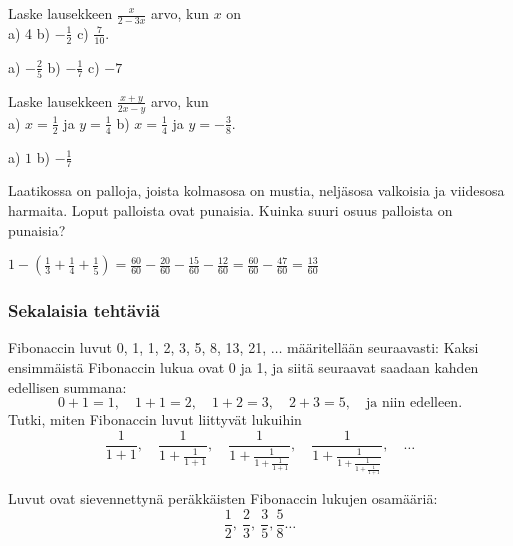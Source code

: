 \begin{tehtava}
Laske lausekkeen $\frac{x}{2-3x}$ arvo, kun $x$ on \\ a) 4 \qquad b) $-\frac{1}{2}$ \qquad c) $\frac{7}{10}$.
\begin{vastaus}
a) $-\frac{2}{5}$ \qquad b) $-\frac{1}{7}$ \qquad c) $-7$
\end{vastaus}
\end{tehtava}

\begin{tehtava}
Laske lausekkeen $\frac{x+y}{2x-y}$ arvo, kun \\ a) $x=\frac{1}{2}$ ja $y= \frac{1}{4}$ \qquad b) $x=\frac{1}{4}$ ja $y= -\frac{3}{8}$.
\begin{vastaus}
a) $1$ \qquad b) $-\frac{1}{7}$
\end{vastaus}
\end{tehtava}

    \begin{tehtava} %
        Laatikossa on palloja, joista kolmasosa on mustia, neljäsosa
        valkoisia ja viidesosa harmaita. Loput palloista ovat punaisia.
        Kuinka suuri osuus palloista on punaisia?
        
        \begin{vastaus}
            $1-(\frac{1}{3}+\frac{1}{4}+\frac{1}{5})
            = \frac{60}{60}-\frac{20}{60}-\frac{15}{60}-\frac{12}{60}
            = \frac{60}{60}-\frac{47}{60}
            = \frac{13}{60}$
        \end{vastaus}
    \end{tehtava}


\subsubsection*{Sekalaisia tehtäviä}

\begin{tehtava}
Fibonaccin luvut 0, 1, 1, 2, 3, 5, 8, 13, 21, $\ldots$ määritellään seuraavasti: Kaksi ensimmäistä
Fibonaccin lukua ovat 0 ja 1, ja siitä seuraavat saadaan kahden
edellisen summana: 
\[ 0+1=1, \quad 1+1=2, \quad 1+2 = 3, \quad 2+3=5, \quad 
\textrm{ja niin edelleen.} \]
Tutki, miten Fibonaccin luvut liittyvät lukuihin
\[ \frac{1}{1+1}, \quad \frac{1}{1+\frac{1}{1+1}}, \quad
\frac{1}{1+\frac{1}{1+\frac{1}{1+1}}}, \quad 
\frac{1}{1+\frac{1}{1+\frac{1}{1+\frac{1}{1+1}}}}, \quad \ldots\]
\begin{vastaus}
Luvut ovat sievennettynä peräkkäisten Fibonaccin
lukujen osamääriä:
\[\frac{1}{2}, \ \frac{2}{3}, \ \frac{3}{5}, \frac{5}{8} \ldots  \]
\end{vastaus}
\end{tehtava}


